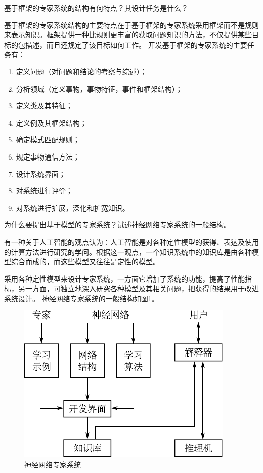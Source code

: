 \begin{question}
基于框架的专家系统的结构有何特点？其设计任务是什么？
\end{question}
\begin{solution}
基于框架的专家系统结构的主要特点在于基于框架的专家系统采用框架而不是规则来表示知识。框架提供一种比规则更丰富的获取问题知识的方法，不仅提供某些目标的包描述，而且还规定了该目标如何工作。 
开发基于框架的专家系统的主要任务有：
	\begin{enumerate}
		\item 定义问题（对问题和结论的考察与综述）；
		\item 分析领域（定义事物，事物特征，事件和框架结构）；
		\item 定义类及其特征；
		\item 定义例及其框架结构；
		\item 确定模式匹配规则；
		\item 规定事物通信方法；
		\item 设计系统界面；
		\item 对系统进行评价；
		\item 对系统进行扩展，深化和扩宽知识。
	\end{enumerate}
\end{solution}

\begin{question}
为什么要提出基于模型的专家系统？试述神经网络专家系统的一般结构。
\end{question}
\begin{solution}
有一种关于人工智能的观点认为：人工智能是对各种定性模型的获得、表达及使用的计算方法进行研究的学问。根据这一观点，一个知识系统中的知识库是由各种模型综合而成的，而这些模型又往往是定性的模型。 \par
采用各种定性模型来设计专家系统，一方面它增加了系统的功能，提高了性能指标，另一方面，可独立地深入研究各种模型及其相关问题，把获得的结果用于改进系统设计。
神经网络专家系统的一般结构如图\ref{Fig:NNES-structure}。
	\begin{figure}[h]
		\centering
		\includegraphics{figures/ans-6.7.pdf}
		\caption{神经网络专家系统} \label{Fig:NNES-structure}
	\end{figure}
\end{solution}

